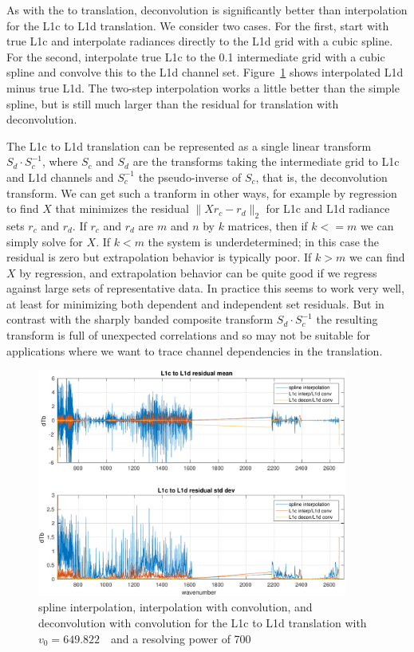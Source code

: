 \documentclass[11pt]{article}
\begin{document}
As with the {\airs} to {\cris} translation, deconvolution is
significantly better than interpolation for the L1c to L1d
translation.  We consider two cases.  For the first, start with true
L1c and interpolate radiances directly to the L1d grid with a cubic
spline.  For the second, interpolate true L1c to the 0.1 {\wn}
intermediate grid with a cubic spline and convolve this to the L1d
channel set.  Figure~\ref{interpL1d} shows interpolated L1d minus
true L1d.  The two-step interpolation works a little better than the
simple spline, but is still much larger than the residual for
translation with deconvolution.

The L1c to L1d translation can be represented as a single linear
transform $S_d\cdot S_c^{-1}$, where $S_c$ and $S_d$ are the
transforms taking the intermediate grid to L1c and L1d channels and
$S_c^{-1}$ the pseudo-inverse of $S_c$, that is, the deconvolution
transform.  We can get such a tranform in other ways, for example by
regression to find $X$ that minimizes the residual $\|X r_c -
r_d\|_2$ for L1c and L1d radiance sets $r_c$ and $r_d$.  If $r_c$ and
$r_d$ are $m$ and $n$ by $k$ matrices, then if $k <= m$ we can simply
solve for $X$.  If $k < m$ the system is underdetermined; in this
case the residual is zero but extrapolation behavior is typically
poor.  If $k > m$ we can find $X$ by regression, and extrapolation
behavior can be quite good if we regress against large sets of
representative data.  In practice this seems to work very well, at
least for minimizing both dependent and independent set residuals.
But in contrast with the sharply banded composite transform $S_d\cdot
S_c^{-1}$ the resulting transform is full of unexpected correlations
and so may not be suitable for applications where we want to trace
channel dependencies in the translation.

\begin{figure} %
  \centering
  \includegraphics[height=7.5cm]{figures/CtoD_interp_diff.pdf}
  \caption{spline interpolation, interpolation with convolution, 
    and deconvolution with convolution for the {\airs} L1c to L1d
    translation with $v_0=649.822$~\wn\ and a resolving power of 700}
  \label{interpL1d}
\end{figure}
\end{document}
